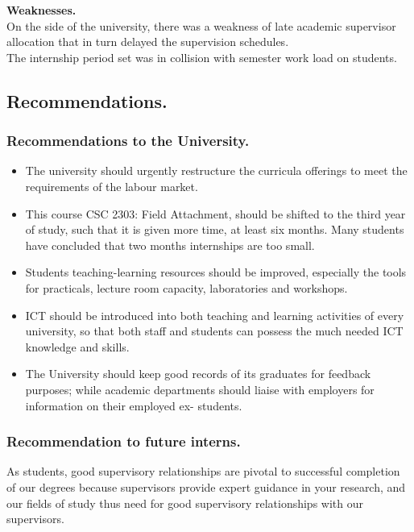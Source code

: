 \documentclass[11pt]{article}
\begin{document}
\textbf{Weaknesses.}\\
On the side of the university, there was a weakness of late academic supervisor allocation that in turn delayed the supervision schedules.\\
The internship period set was in collision with semester work load on students.\\

\subsection{Recommendations.}
\subsubsection{Recommendations to the University.}
\begin{itemize}
	\item The university should urgently restructure the curricula offerings to meet the requirements
	of the labour market.\\
	\item This course CSC 2303: Field Attachment, should be shifted to the third year of study, such
	that it is given more time, at least six months. Many students have concluded that two
	months internships are too small.\\
	\item Students teaching-learning resources should be improved, especially the tools for
	practicals, lecture room capacity, laboratories and workshops.\\
	\item ICT should be introduced into both teaching and learning activities of every university, so
	that both staff and students can possess the much needed ICT knowledge and skills.\\
	\item The University should keep good records of its graduates for feedback purposes; while
	academic departments should liaise with employers for information on their employed ex-
	students.\\
	
\end{itemize}

\subsubsection{Recommendation to future interns.}
As students, good supervisory relationships are pivotal to successful completion of our degrees
because supervisors provide expert guidance in your research, and our fields of study thus need
for good supervisory relationships with our supervisors.\\
\end{document}
